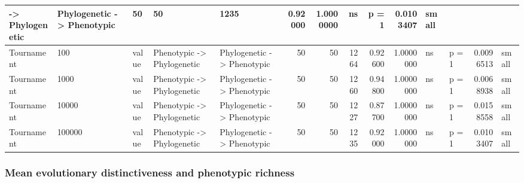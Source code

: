 \documentclass[]{book}
\begin{document}
\begin{table}
\begin{tabular}[t]{l|l|l|l|l|r|r|r|r|r|l|l|r|l}
    ->
Phylogenetic & Phylogenetic
    ->
Phenotypic & 50 & 50 & 1235 & 0.92000 & 1.0000000 & ns & p = 1 & 0.0103407 & small\\
\hline
Tournament & 100 & value & Phenotypic
    ->
Phylogenetic & Phylogenetic
    ->
Phenotypic & 50 & 50 & 1264 & 0.92600 & 1.0000000 & ns & p = 1 & 0.0096513 & small\\
\hline
Tournament & 1000 & value & Phenotypic
    ->
Phylogenetic & Phylogenetic
    ->
Phenotypic & 50 & 50 & 1260 & 0.94800 & 1.0000000 & ns & p = 1 & 0.0068938 & small\\
\hline
Tournament & 10000 & value & Phenotypic
    ->
Phylogenetic & Phylogenetic
    ->
Phenotypic & 50 & 50 & 1227 & 0.87700 & 1.0000000 & ns & p = 1 & 0.0158558 & small\\
\hline
Tournament & 100000 & value & Phenotypic
    ->
Phylogenetic & Phylogenetic
    ->
Phenotypic & 50 & 50 & 1235 & 0.92000 & 1.0000000 & ns & p = 1 & 0.0103407 & small\\
\hline
\end{tabular}
\end{table}

\hypertarget{mean-evolutionary-distinctiveness-and-phenotypic-richness}{%
\subsubsection{Mean evolutionary distinctiveness and phenotypic richness}\label{mean-evolutionary-distinctiveness-and-phenotypic-richness}}
\end{document}
